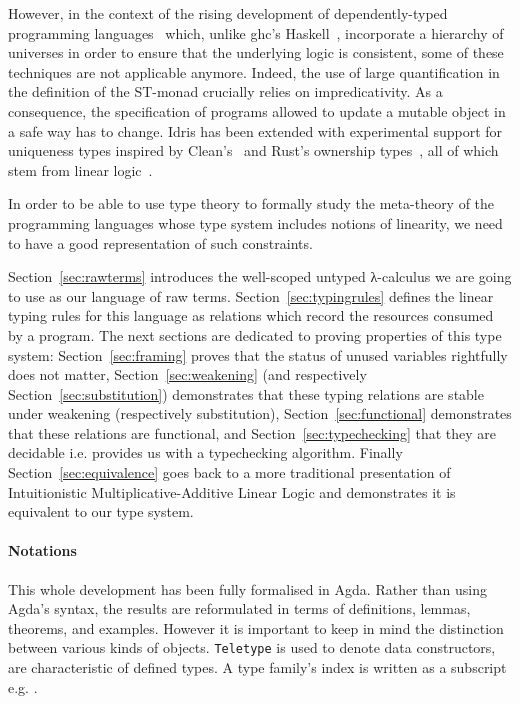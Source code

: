 However, in the context of the rising development of dependently-typed
programming languages~\cite{Brady2013idris, norell2009dependently} which,
unlike ghc's Haskell~\cite{weirich2013towards}, incorporate a hierarchy
of universes in order to ensure that the underlying logic is consistent,
some of these techniques are not applicable anymore. Indeed, the use of
large quantification in the definition of the ST-monad crucially relies
on impredicativity. As a consequence, the specification of programs
allowed to update a mutable object in a safe way has to change.
Idris has been extended with experimental support for uniqueness types
inspired by Clean's~\cite{achten1993high} and Rust's ownership types~\cite{manual:rust},
all of which stem from linear logic~\cite{girard1987linear}.

In order to be able to use type theory to formally study the meta-theory
of the programming languages whose type system includes notions of linearity,
we need to have a good representation of such constraints.

Section~\ref{sec:rawterms} introduces the well-scoped untyped λ-calculus
we are going to use as our language of raw terms. Section~\ref{sec:typingrules}
defines the linear typing rules for this language as relations which
record the resources consumed by a program. The next sections are dedicated
to proving properties of this type system: Section~\ref{sec:framing}
proves that the status of unused variables rightfully does not matter,
Section~\ref{sec:weakening} (and respectively Section~\ref{sec:substitution})
demonstrates that these typing relations are stable under weakening
(respectively substitution), Section~\ref{sec:functional} demonstrates that
these relations are functional, and Section~\ref{sec:typechecking} that
they are decidable i.e. provides us with a typechecking algorithm. Finally
Section~\ref{sec:equivalence} goes back to a more traditional presentation
of Intuitionistic Multiplicative-Additive Linear Logic and demonstrates it is
equivalent to our type system.


\paragraph*{Notations} This whole development has been fully formalised
in Agda. Rather than using Agda's syntax, the results are reformulated
in terms of definitions, lemmas, theorems, and examples. However it is
important to keep in mind the distinction between various kinds of objects.
\texttt{Teletype} is used to denote data constructors,  are characteristic of defined types. A type family's index is
written as a subscript e.g. .

